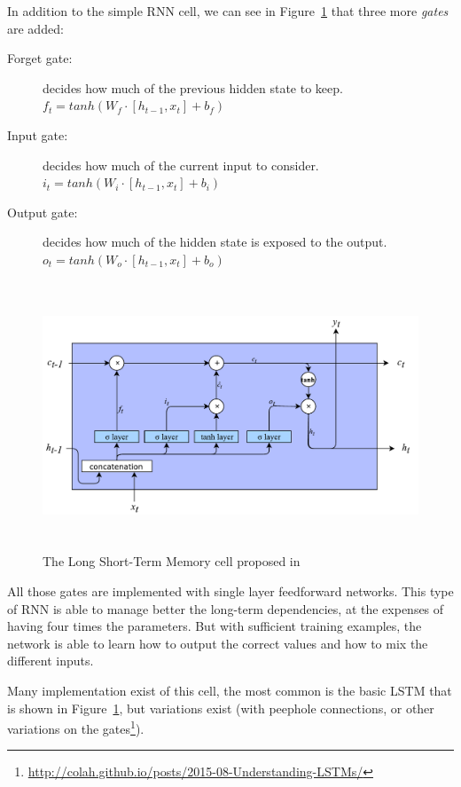 In addition to the simple RNN cell, we can see in Figure~\ref{fig:LSTM} that three more \textit{gates} are added:

\begin{description}
	\item[Forget gate:] decides how much of the previous hidden state to keep.\\$f_{t}=tanh \left( W_{f}\cdot  \left[ h_{t-1}, x_{t} \right]  + b_{f} \right)$
	\item[Input gate:] decides how much of the current input to consider.\\$i_{t}=tanh \left( W_{i}\cdot  \left[ h_{t-1}, x_{t} \right]  + b_{i} \right)$
	\item[Output gate:] decides how much of the hidden state is exposed to the output.\\$o_{t}=tanh \left( W_{o}\cdot  \left[ h_{t-1}, x_{t} \right]  + b_{o} \right)$
\end{description}

\begin{figure}[!htb]
    \centering
    \includegraphics[max width=0.9\linewidth,max height=8cm,keepaspectratio]{figures/LSTM}
    \caption{The Long Short-Term Memory cell proposed in~\cite{hochreiter1997long}}\label{fig:LSTM}
\end{figure}

All those gates are implemented with single layer feedforward networks. This type of RNN is able to manage better the long-term dependencies, at the expenses of having four times the parameters. But with sufficient training examples, the network is able to learn how to output the correct values and how to mix the different inputs.

Many implementation exist of this cell, the most common is the basic LSTM that is shown in Figure~\ref{fig:LSTM}, but variations exist (with peephole connections, or other variations on the gates\footnote{\url{http://colah.github.io/posts/2015-08-Understanding-LSTMs/}}).

